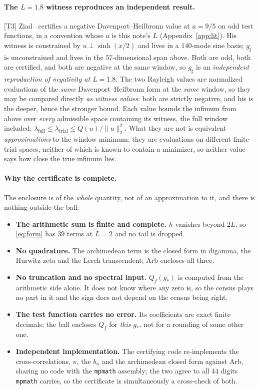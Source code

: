 \documentclass[11pt,a4paper]{article}
\theoremstyle{definition}
\theoremstyle{remark}
\newcommand{\tier}[1]{{\small\textsf{[#1]}}}
\begin{document}
\paragraph{The $L=1.8$ witness reproduces an independent result.} \tier{T3}
Ziad~\cite{Ziad} certifies a negative Davenport--Heilbronn value at $a = 9/5$ on odd
test functions, in a convention whose $a$ is this note's $L$
(Appendix~\ref{app:lit}). His witness is constrained by $u \perp \sinh(x/2)$ and lives in
a $140$-mode sine basis; $g_\sharp$ is unconstrained and lives in the $57$-dimensional
span above. Both are odd, both are certified, and both are negative at the same window,
so $g_\sharp$ is an \emph{independent reproduction of negativity at $L = 1.8$}. The two
Rayleigh values are normalized evaluations of the \emph{same} Davenport--Heilbronn form
at the \emph{same} window, so they may be compared directly \emph{as witness values}:
both are strictly negative, and his is the deeper, hence the stronger bound. Each value
bounds the infimum from above over \emph{every} admissible space containing its witness,
the full window included:
$\lambda_{\mathrm{full}} \le \lambda_{\mathrm{trial}} \le Q(u)/\|u\|_2^2$. What they are
not is equivalent \emph{approximations} to the window minimum: they are evaluations on
different finite trial spaces, neither of which is known to contain a minimizer, so
neither value says how close the true infimum lies.

\paragraph{Why the certificate is complete.} The enclosure is of the \emph{whole}
quantity, not of an approximation to it, and there is nothing outside the ball:

\begin{itemize}\itemsep2pt
\item \textbf{The arithmetic sum is finite and complete.} $h$ vanishes beyond $2L$, so
\eqref{eq:form} has $39$ terms at $L=2$ and no tail is dropped.
\item \textbf{No quadrature.} The archimedean term is the closed form in digamma, the
Hurwitz zeta and the Lerch transcendent; Arb encloses all three.
\item \textbf{No truncation and no spectral input.} $Q_f(g_*)$ is computed from the
arithmetic side alone. It does not know where any zero is, so the census plays no part in
it and the sign does not depend on the census being right.
\item \textbf{The test function carries no error.} Its coefficients are exact finite
decimals; the ball encloses $Q_f$ for \emph{this} $g_*$, not for a rounding of some other
one.
\item \textbf{Independent implementation.} The certifying code re-implements the
cross-correlations, $\kappa$, the $b_n$ and the archimedean closed form against Arb,
sharing no code with the \texttt{mpmath} assembly; the two agree to all $44$ digits
\texttt{mpmath} carries, so the certificate is simultaneously a cross-check of both.
\end{itemize}
\end{document}
